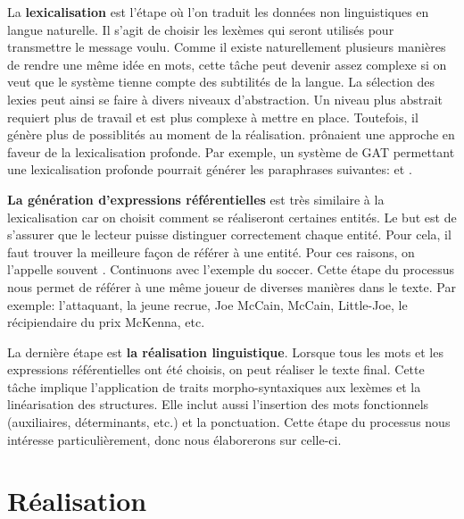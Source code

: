 La \textbf{lexicalisation} est l'étape où l'on traduit les données non linguistiques en langue naturelle. Il s'agit de choisir les lexèmes qui seront utilisés pour transmettre le message voulu. Comme il existe naturellement plusieurs manières de rendre une même idée en mots, cette tâche peut devenir assez complexe si on veut que le système tienne compte des subtilités de la langue. La sélection des lexies peut ainsi se faire à divers niveaux d'abstraction. Un niveau plus abstrait requiert plus de travail et est plus complexe à mettre en place. Toutefois, il génère plus de possiblités au moment de la réalisation. \cite{ElhadadFloatingConstraintsLexical1997} prônaient une approche en faveur de la lexicalisation profonde. Par exemple, un système de \ac{GAT} permettant une lexicalisation profonde pourrait générer les paraphrases suivantes:  et .

\textbf{La génération d'expressions référentielles} est très similaire à la lexicalisation car on choisit comment se réaliseront certaines entités. Le but est de s'assurer que le lecteur puisse distinguer correctement chaque entité. Pour cela, il faut trouver la meilleure façon de référer à une entité. Pour ces raisons, on l'appelle souvent . Continuons avec l'exemple du soccer. Cette étape du processus nous permet de référer à une même joueur de diverses manières dans le texte. Par exemple: l'attaquant, la jeune recrue, Joe McCain, McCain, Little-Joe, le récipiendaire du prix McKenna, etc.

La dernière étape est \textbf{la réalisation linguistique}. Lorsque tous les mots et les expressions référentielles ont été choisis, on peut réaliser le texte final. Cette tâche implique l'application de traits morpho-syntaxiques aux lexèmes et la linéarisation des structures. Elle inclut aussi l'insertion des mots fonctionnels (auxiliaires, déterminants, etc.) et la ponctuation. Cette étape du processus nous intéresse particulièrement, donc nous élaborerons sur celle-ci.





\section{Réalisation}

